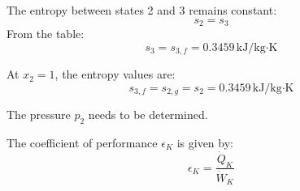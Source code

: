 The entropy between states 2 and 3 remains constant:  
\[
s_2 = s_3
\]  
From the table:  
\[
s_3 = s_{3,f} = 0.3459 \, \text{kJ/kg·K}
\]  

At \( x_2 = 1 \), the entropy values are:  
\[
s_{3,f} = s_{2,g} = s_2 = 0.3459 \, \text{kJ/kg·K}
\]  

The pressure \( p_2 \) needs to be determined.

The coefficient of performance \( \epsilon_K \) is given by:  
\[
\epsilon_K = \frac{\dot{Q}_K}{\dot{W}_K}
\]